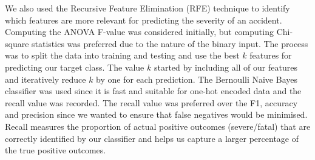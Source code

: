 We also used the Recursive Feature Elimination (RFE) technique to identify which features are more relevant for predicting the severity of an accident.
Computing the ANOVA F-value was considered initially, but computing Chi-square statistics was preferred due to the nature of the binary input.
The process was to split the data into training and testing and use the best $k$ features for predicting our target class.
The value $k$ started by including all of our features and iteratively reduce $k$ by one for each prediction.
The Bernoulli Naive Bayes classifier was used since it is fast and suitable for one-hot encoded data and the recall value was recorded.
The recall value was preferred over the F1, accuracy and precision since we wanted to ensure that false negatives would be minimised.
Recall measures the proportion of actual positive outcomes (severe/fatal) that are correctly identified by our classifier and helps us capture a larger percentage of the true positive outcomes.